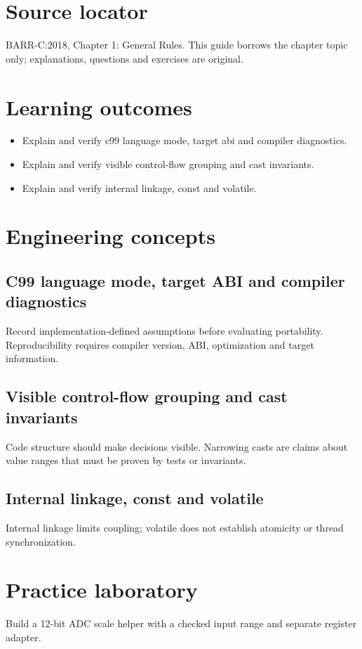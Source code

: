 \documentclass[10pt,letterpaper]{article}
\begin{document}
\makedoctitle
\makedocsummary
\section{Source locator}
BARR-C:2018, Chapter 1: General Rules. This guide borrows the chapter topic only; explanations, questions and exercises are original.
\section{Learning outcomes}
\begin{itemize}
\item Explain and verify c99 language mode, target abi and compiler diagnostics.
\item Explain and verify visible control-flow grouping and cast invariants.
\item Explain and verify internal linkage, const and volatile.
\end{itemize}

\section{Engineering concepts}
\subsection{C99 language mode, target ABI and compiler diagnostics}
Record implementation-defined assumptions before evaluating portability. Reproducibility requires compiler version, ABI, optimization and target information.

\subsection{Visible control-flow grouping and cast invariants}
Code structure should make decisions visible. Narrowing casts are claims about value ranges that must be proven by tests or invariants.

\subsection{Internal linkage, const and volatile}
Internal linkage limits coupling; volatile does not establish atomicity or thread synchronization.

\section{Practice laboratory}
Build a 12-bit ADC scale helper with a checked input range and separate register adapter.
\end{document}
